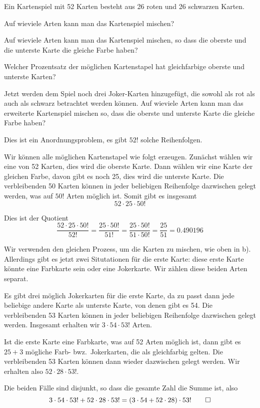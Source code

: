 Ein Kartenspiel mit 52 Karten besteht aus 26 roten und 26 schwarzen
Karten.
\begin{teilaufgaben}
\item
Auf wieviele Arten kann man das Kartenspiel mischen?
\item
Auf wieviele Arten kann man das Kartenspiel mischen, so dass die oberste
und die unterste Karte die gleiche Farbe haben?
\item 
Welcher Prozentsatz der möglichen Kartenstapel hat gleichfarbige
oberste und unterste Karten?
\item
Jetzt werden dem Spiel noch drei Joker-Karten hinzugefügt, die sowohl
als rot als auch als schwarz betrachtet werden können.
Auf wieviele Arten kann man das erweiterte Kartenspiel mischen so, 
dass die oberste und unterste Karte die gleiche Farbe haben?
\end{teilaufgaben}


\begin{loesung}
\begin{teilaufgaben}
\item
Dies ist ein Anordnungsproblem, es gibt $52!$ solche Reihenfolgen.
\item
Wir können alle möglichen Kartenstapel wie folgt erzeugen.
Zunächst wählen wir eine von 52 Karten, dies wird die oberste
Karte.
Dann wählen wir eine Karte der gleichen Farbe, davon gibt es noch 25,
dies wird die unterste Karte.
Die verbleibenden 50 Karten können in jeder beliebigen Reihenfolge
dazwischen gelegt werden, was auf $50!$ Arten möglich ist.
Somit gibt es insgesamt
\[
52\cdot 25\cdot 50!
\]
\item
Dies ist der Quotient
\[
\frac{52\cdot 25\cdot 50!}{52!}
=
\frac{25\cdot 50!}{51!}
=
\frac{25\cdot 50!}{51\cdot 50!}
=
\frac{25}{51}
=
0.490196%
\]
\item
Wir verwenden den gleichen Prozess, um die Karten zu mischen, wie oben in 
b).
Allerdings gibt es jetzt zwei Situtationen für die erste Karte: diese
erste Karte könnte eine Farbkarte sein oder eine Jokerkarte.
Wir zählen diese beiden Arten separat.

Es gibt drei möglich Jokerkarten für die erste Karte, da zu passt dann jede
beliebige andere Karte als unterste Karte, von denen gibt es 54.
Die verbleibenden 53 Karten können in jeder beliebigen Reihenfolge dazwischen 
gelegt werden. 
Insgesamt erhalten wir $3\cdot 54 \cdot 53!$ Arten.

Ist die erste Karte eine Farbkarte, was auf 52 Arten möglich ist, dann
gibt es $25+3$ mögliche Farb- bwz.~Jokerkarten, die als gleichfarbig
gelten.
Die verbleibenden 53 Karten können dann wieder dazwischen gelegt werden.
Wir erhalten also 
$52\cdot 28\cdot 53!$.

Die beiden Fälle sind disjunkt, so dass die gesamte Zahl die Summe ist,
also
\[
3\cdot 54 \cdot 53! + 52 \cdot 28 \cdot 53!
=
(3\cdot 54 + 52\cdot 28)\cdot 53!
\qedhere
\]
\end{teilaufgaben}
\end{loesung}

